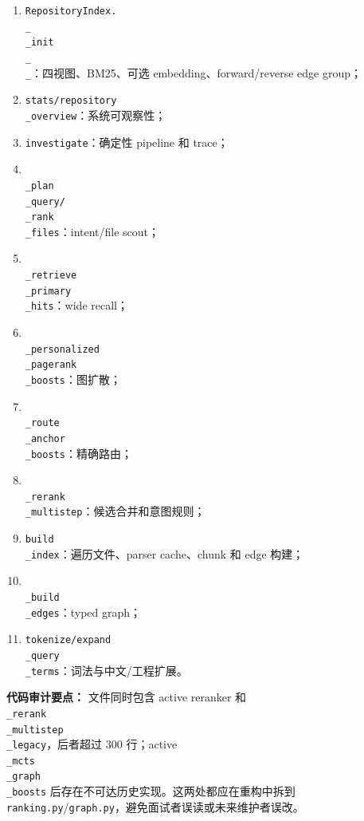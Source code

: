\documentclass[UTF8,12pt,openany]{ctexbook}
\begin{document}
\begin{enumerate}
\item \texttt{RepositoryIndex.\\_\\_init\\_\\_}：四视图、BM25、可选 embedding、forward/reverse edge group；
\item \texttt{stats/repository\\_overview}：系统可观察性；
\item \texttt{investigate}：确定性 pipeline 和 trace；
\item \texttt{\\_plan\\_query/\\_rank\\_files}：intent/file scout；
\item \texttt{\\_retrieve\\_primary\\_hits}：wide recall；
\item \texttt{\\_personalized\\_pagerank\\_boosts}：图扩散；
\item \texttt{\\_route\\_anchor\\_boosts}：精确路由；
\item \texttt{\\_rerank\\_multistep}：候选合并和意图规则；
\item \texttt{build\\_index}：遍历文件、parser cache、chunk 和 edge 构建；
\item \texttt{\\_build\\_edges}：typed graph；
\item \texttt{tokenize/expand\\_query\\_terms}：词法与中文/工程扩展。
\end{enumerate}

\textbf{代码审计要点：} 文件同时包含 active reranker 和 \texttt{\\_rerank\\_multistep\\_legacy}，后者超过 300 行；active \texttt{\\_mcts\\_graph\\_boosts} 后存在不可达历史实现。这两处都应在重构中拆到 \texttt{ranking.py}/\texttt{graph.py}，避免面试者误读或未来维护者误改。\par
\end{document}
